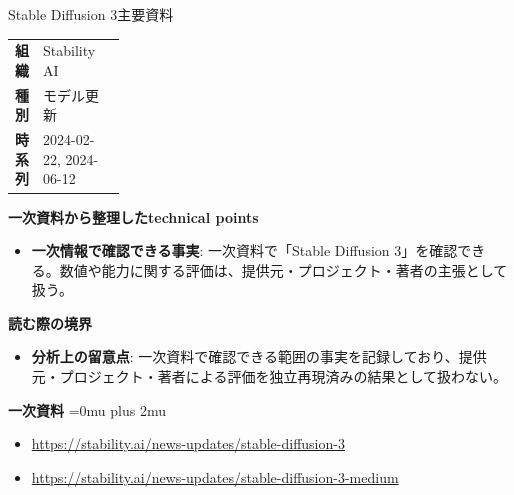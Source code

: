\begin{technicalnote}{Stable Diffusion 3}{主要資料}
\begingroup
\begin{tabularx}{\linewidth}{@{}>{\bfseries}p{0.22\linewidth}X@{}}
組織 & Stability AI \\
種別 & モデル更新 \\
時系列 & 2024-02-22, 2024-06-12 \\
\end{tabularx}
\smallskip
{\bfseries 一次資料から整理したtechnical points}
\begin{itemize}[leftmargin=1.5em,itemsep=0.35em]
\item \textbf{一次情報で確認できる事実}: 一次資料で「Stable Diffusion 3」を確認できる。数値や能力に関する評価は、提供元・プロジェクト・著者の主張として扱う。
\end{itemize}
\begin{minipage}{\linewidth}
{\bfseries 読む際の境界}
\begin{itemize}[leftmargin=1.5em,itemsep=0.35em]
\item \textbf{分析上の留意点}: 一次資料で確認できる範囲の事実を記録しており、提供元・プロジェクト・著者による評価を独立再現済みの結果として扱わない。
\end{itemize}
\begin{samepage}
{\bfseries 一次資料}
\begingroup\sloppy
\Urlmuskip=0mu plus 2mu\relax
\begin{itemize}[leftmargin=1.5em,itemsep=0.25em]
\item {\scriptsize\url{https://stability.ai/news-updates/stable-diffusion-3}}
\item {\scriptsize\url{https://stability.ai/news-updates/stable-diffusion-3-medium}}
\end{itemize}
\endgroup
\end{samepage}
\end{minipage}
\endgroup
\end{technicalnote}
\medskip

